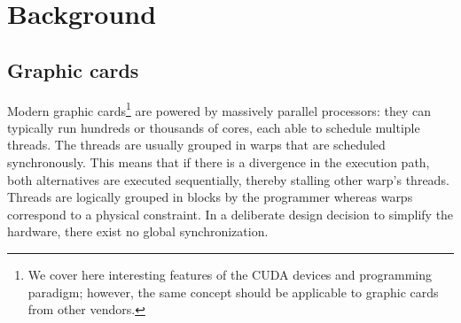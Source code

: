 

\section{Background} \label{background}
\subsection{Graphic cards}
Modern graphic cards\footnote{We cover here interesting features of the CUDA devices and programming paradigm; however, the same concept should be applicable to graphic cards from other vendors.} are powered by massively parallel processors: they can typically run hundreds or thousands of cores, each able to schedule multiple threads. The threads are usually grouped in warps that are scheduled synchronously. This means that if there is a divergence in the execution path, both alternatives are executed sequentially, thereby stalling other warp's threads. Threads are logically grouped in blocks by the programmer whereas warps correspond to a physical constraint. In a deliberate design decision to simplify the hardware, there exist no global synchronization.

